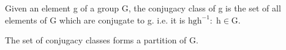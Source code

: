 Given an element g of a group G, the conjugacy class of g is the set of all
elements of G which are conjugate to g. i.e. it is $ { \mathrm{hgh}^{-1} :
\; \mathrm{h} \in \mathrm{G} } . $
\par
The set of conjugacy classes forms a partition of G.
